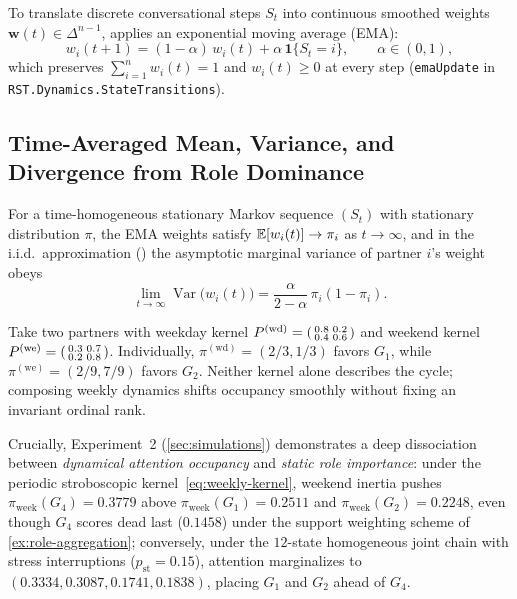 To translate discrete conversational steps $S_t$ into continuous smoothed weights
$\mathbf{w}(t) \in \Delta^{n-1}$, \RST{} applies an exponential moving average (EMA):
\begin{equation}
  w_i(t + 1) = (1 - \alpha)\, w_i(t) + \alpha\, \mathbf{1}\{S_t = i\},
  \qquad \alpha \in (0, 1),
  \label{eq:ema-weights}
\end{equation}
which preserves $\sum_{i=1}^n w_i(t) = 1$ and $w_i(t) \ge 0$ at every step
(\texttt{emaUpdate} in \texttt{RST.Dynamics.\allowbreak{}StateTransitions}).

\subsection{Time-Averaged Mean, Variance, and Divergence from Role Dominance}
\label{subsec:dyn-variance}

\noindent\layermath{} For a time-homogeneous stationary Markov sequence $(S_t)$ with
stationary distribution $\pi$, the EMA weights satisfy $\mathbb{E}[w_i(t)] \to \pi_i$ as $t \to \infty$,
and in the i.i.d.\ approximation (\citealp{ross1996stochastic}) the asymptotic marginal
variance of partner $i$'s weight obeys
\begin{equation}
  \lim_{t \to \infty} \operatorname{Var}\bigl(w_i(t)\bigr)
  = \frac{\alpha}{2 - \alpha}\,\pi_i(1 - \pi_i).
  \label{eq:ema-variance}
\end{equation}

\begin{example}
\label{ex:markov-2x2}
Take two partners with weekday kernel $P^{(\mathrm{wd})} = \begin{psmallmatrix} 0.8 & 0.2 \\ 0.4 & 0.6 \end{psmallmatrix}$
and weekend kernel $P^{(\mathrm{we})} = \begin{psmallmatrix} 0.3 & 0.7 \\ 0.2 & 0.8 \end{psmallmatrix}$.
Individually, $\pi^{(\mathrm{wd})} = (2/3, 1/3)$ favors $G_1$, while
$\pi^{(\mathrm{we})} = (2/9, 7/9)$ favors $G_2$. Neither kernel alone describes the cycle;
composing weekly dynamics shifts occupancy smoothly without fixing an invariant ordinal rank.
\end{example}

\noindent\layerformal{} Crucially, Experiment~2 (\cref{sec:simulations}) demonstrates a deep
dissociation between \emph{dynamical attention occupancy} and \emph{static role importance}:
under the periodic stroboscopic kernel~\eqref{eq:weekly-kernel}, weekend inertia pushes
$\pi_{\mathrm{week}}(G_4) = 0.3779$ above $\pi_{\mathrm{week}}(G_1) = 0.2511$ and
$\pi_{\mathrm{week}}(G_2) = 0.2248$, even though $G_4$ scores dead last ($0.1458$) under the
support weighting scheme of \cref{ex:role-aggregation}; conversely, under the $12$-state
homogeneous joint chain with stress interruptions ($p_{\mathrm{st}} = 0.15$), attention
marginalizes to $(0.3334, 0.3087, 0.1741, 0.1838)$, placing $G_1$ and $G_2$ ahead of $G_4$.

